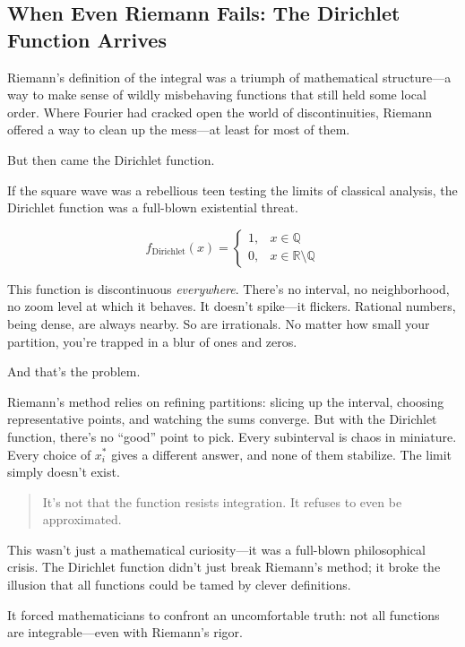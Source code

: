 \subsection{When Even Riemann Fails: The Dirichlet Function Arrives}

Riemann’s definition of the integral was a triumph of mathematical structure—a way to make sense of wildly misbehaving functions that still held some local order. Where Fourier had cracked open the world of discontinuities, Riemann offered a way to clean up the mess—at least for most of them.

But then came the Dirichlet function.

If the square wave was a rebellious teen testing the limits of classical analysis, the Dirichlet function was a full-blown existential threat.

\[
f_{\text{Dirichlet}}(x) =
\begin{cases}
1, & x \in \mathbb{Q} \\
0, & x \in \mathbb{R} \setminus \mathbb{Q}
\end{cases}
\]

This function is discontinuous \emph{everywhere}. There’s no interval, no neighborhood, no zoom level at which it behaves. It doesn’t spike—it flickers. Rational numbers, being dense, are always nearby. So are irrationals. No matter how small your partition, you’re trapped in a blur of ones and zeros.

And that’s the problem.

Riemann’s method relies on refining partitions: slicing up the interval, choosing representative points, and watching the sums converge. But with the Dirichlet function, there’s no “good” point to pick. Every subinterval is chaos in miniature. Every choice of \(x_i^*\) gives a different answer, and none of them stabilize. The limit simply doesn’t exist.

\begin{quote}
It’s not that the function resists integration.  
It refuses to even be approximated.
\end{quote}

This wasn’t just a mathematical curiosity—it was a full-blown philosophical crisis. The Dirichlet function didn’t just break Riemann’s method; it broke the illusion that all functions could be tamed by clever definitions.

It forced mathematicians to confront an uncomfortable truth:  
not all functions are integrable—even with Riemann’s rigor.

